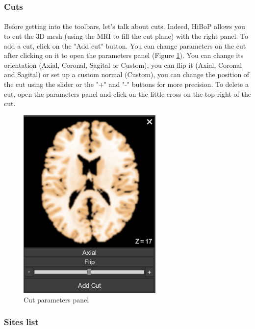 \documentclass[a4paper]{article}
\begin{document}
\subsubsection{Cuts}\label{cuts}
\paragraph{} Before getting into the toolbars, let's talk about cuts. Indeed, HiBoP allows you to cut the 3D mesh (using the MRI to fill the cut plane) with the right panel. To add a cut, click on the "Add cut" button. You can change parameters on the cut after clicking on it to open the parameters panel (Figure \ref{cut}). You can change its orientation (Axial, Coronal, Sagital or Custom), you can flip it (Axial, Coronal and Sagital) or set up a custom normal (Custom), you can change the position of the cut using the slider or the "+" and "-" buttons for more precision. To delete a cut, open the parameters panel and click on the little cross on the top-right of the cut.
\begin{figure}[H]
\begin{center}
\includegraphics[scale=0.5]{Cut.png}
\end{center}
\caption{\label{cut}Cut parameters panel}
\end{figure}
\subsubsection{Sites list}\label{sitesList}
\end{document}
